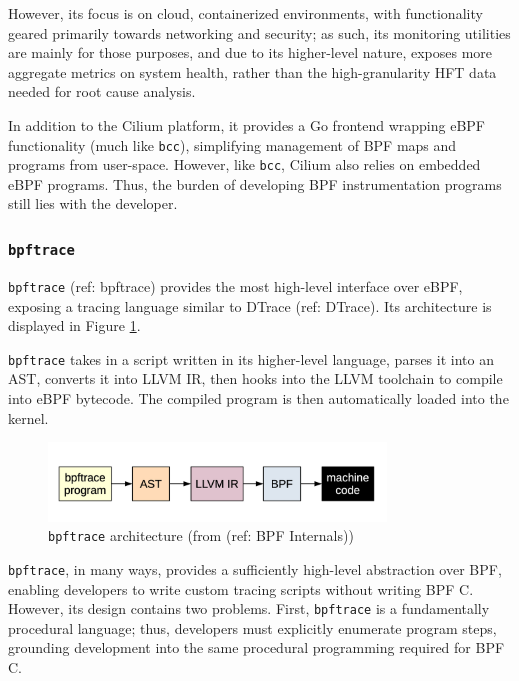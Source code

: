 However, its focus is on cloud, containerized environments, with functionality geared primarily
towards networking and security; as such, its monitoring utilities are mainly for those purposes,
and due to its higher-level nature, exposes more aggregate metrics on system health, rather than the
high-granularity HFT data needed for root cause analysis.

In addition to the Cilium platform, it provides a Go frontend wrapping eBPF functionality (much like
\texttt{bcc}), simplifying management of BPF maps and programs from user-space. However, like
\texttt{bcc}, Cilium also relies on embedded eBPF programs. Thus, the burden of developing BPF
instrumentation programs still lies with the developer.

\subsubsection{\texttt{bpftrace}}

\texttt{bpftrace} (ref: bpftrace) provides the most high-level interface over eBPF, exposing a
tracing language similar to DTrace (ref: DTrace). Its architecture is displayed in Figure
\ref{fig:bpftrace-architecture}.

\texttt{bpftrace} takes in a script written in its higher-level language, parses it into an AST,
converts it into LLVM IR, then hooks into the LLVM toolchain to compile into eBPF bytecode. The
compiled program is then automatically loaded into the kernel.

\begin{figure}[htpb]
    \centering
    \includegraphics[width=0.8\textwidth]{diagrams/bpftrace-architecture.png}
    \caption{\texttt{bpftrace} architecture (from (ref: BPF Internals))}
    \label{fig:bpftrace-architecture}
\end{figure}

\texttt{bpftrace}, in many ways, provides a sufficiently high-level abstraction over BPF, enabling
developers to write custom tracing scripts without writing BPF C. However, its design contains
two problems. First, \texttt{bpftrace} is a fundamentally procedural language; thus, developers must
explicitly enumerate program steps, grounding development into the same procedural
programming required for BPF C.

